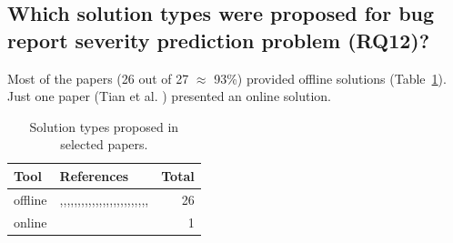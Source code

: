\subsection{Which solution types were proposed for bug report severity prediction problem (RQ12)?}\label{subsec:rq12}

Most of the papers (26 out of 27 $\approx$ 93\%) provided offline solutions (Table~\ref{tab:solutions_types_by_papers}). Just one paper (Tian et al. \cite{Tian:2012}) presented an online solution.

\begin{table}[!htbp]
  \centering
  \caption{Solution types proposed in selected papers.}
  \begin{tabular}{@{}lp{6cm}r@{}}
    \toprule
    Tool & References & Total \\
    \midrule
    offline & \cite{Lamkanfi:2010},\cite{Lamkanfi:2011},\cite{Yang:2012},\cite{Chaturvedi:2012},\cite{Yang:2014b},\cite{Yang:2014a},\cite{Valdivia:2014},\cite{Meera:2014},\cite{Roy:2014},\cite{Saha:2015},\cite{Zhang:2015},\cite{Sharma:2015},\cite{Xia:2015},\cite{Gujral:2015},\cite{Pushpalathas:2016},\cite{Otoom:2016},\cite{Sabor:2016},\cite{Tian:2016},\cite{Zhang:2016},\cite{Jin:2016a},\cite{Choeikiwong:2016},\cite{Jin:2016b},\cite{Jin:2016c},\cite{Yang:2017},\cite{Singh:2017},\cite{Roy:2017} & 26 \\
    \midrule
    online & \cite{Tian:2012} & 1 \\
    \bottomrule
  \end{tabular}
  \label{tab:solutions_types_by_papers}
\end{table}
